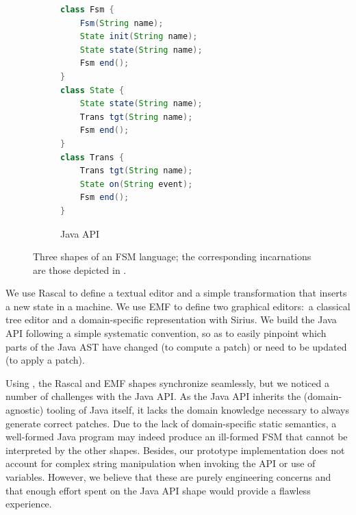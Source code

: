 \begin{figure}[bt]
	\enskip
	\vrule
	\enskip
	\begin{subfigure}[t]{.35\columnwidth}
		\vskip 0pt
		\begin{lstlisting}[label=lst:fsm-api, language=Java, numbers=none, xleftmargin=0pt, tabsize=1, aboveskip=0pt, belowskip=0pt, abovecaptionskip=0pt]
class Fsm {
	Fsm(String name);
	State init(String name);
	State state(String name);
	Fsm end();
}
class State {
	State state(String name);
	Trans tgt(String name);
	Fsm end();
}
class Trans {
	Trans tgt(String name);
	State on(String event);
	Fsm end();
}
		\end{lstlisting}
		\caption{Java API}
	\end{subfigure}
	\caption{Three shapes of an FSM language; the corresponding incarnations are those depicted in .}
	\label{fig:3fsms}
\end{figure}

We use Rascal to define a textual editor and a simple transformation that inserts a new state in a machine.
We use EMF to define two graphical editors:~a classical tree editor and a domain-specific representation with Sirius.
We build the Java API following a simple systematic convention, so as to easily pinpoint which parts of the Java AST have changed (to compute a patch) or need to be updated (to apply a patch).



Using \prism, the Rascal and EMF shapes synchronize seamlessly, but we noticed a number of challenges with the Java API.
As the Java API inherits the (domain-agnostic) tooling of Java itself, it lacks the domain knowledge necessary to always generate correct patches.
Due to the lack of domain-specific static semantics, a well-formed Java program may indeed produce an ill-formed FSM that cannot be interpreted by the other shapes.
Besides, our prototype implementation does not account for complex string manipulation when invoking the API or use of variables.
However, we believe that these are purely engineering concerns and that enough effort spent on the Java API shape would provide a flawless experience.

